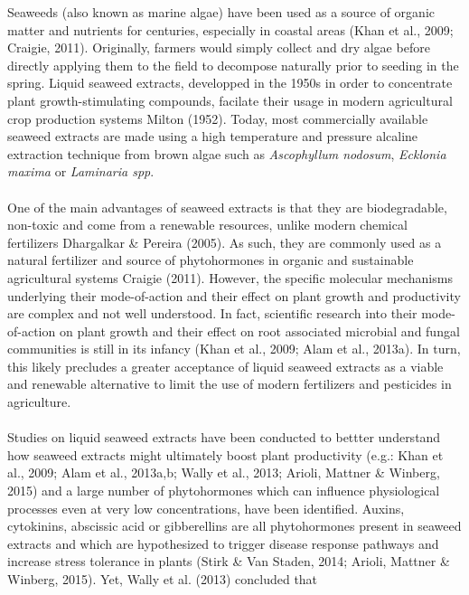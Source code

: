\documentclass[11pt,]{article}
\begin{document}
Seaweeds (also known as marine algae) have been used as a source of
organic matter and nutrients for centuries, especially in coastal areas
(Khan et al., 2009; Craigie, 2011). Originally, farmers would simply
collect and dry algae before directly applying them to the field to
decompose naturally prior to seeding in the spring. Liquid seaweed
extracts, developped in the 1950s in order to concentrate plant
growth-stimulating compounds, facilate their usage in modern
agricultural crop production systems Milton (1952). Today, most
commercially available seaweed extracts are made using a high
temperature and pressure alcaline extraction technique from brown algae
such as \emph{Ascophyllum nodosum}, \emph{Ecklonia maxima} or
\emph{Laminaria spp}.\\
\hspace*{0.333em}\\
One of the main advantages of seaweed extracts is that they are
biodegradable, non-toxic and come from a renewable resources, unlike
modern chemical fertilizers Dhargalkar \& Pereira (2005). As such, they
are commonly used as a natural fertilizer and source of phytohormones in
organic and sustainable agricultural systems Craigie (2011). However,
the specific molecular mechanisms underlying their mode-of-action and
their effect on plant growth and productivity are complex and not well
understood. In fact, scientific research into their mode-of-action on
plant growth and their effect on root associated microbial and fungal
communities is still in its infancy (Khan et al., 2009; Alam et al.,
2013a). In turn, this likely precludes a greater acceptance of liquid
seaweed extracts as a viable and renewable alternative to limit the use
of modern fertilizers and pesticides in agriculture.\\
\hspace*{0.333em}\\
Studies on liquid seaweed extracts have been conducted to bettter
understand how seaweed extracts might ultimately boost plant
productivity (e.g.: Khan et al., 2009; Alam et al., 2013a,b; Wally et
al., 2013; Arioli, Mattner \& Winberg, 2015) and a large number of
phytohormones which can influence physiological processes even at very
low concentrations, have been identified. Auxins, cytokinins, abscissic
acid or gibberellins are all phytohormones present in seaweed extracts
and which are hypothesized to trigger disease response pathways and
increase stress tolerance in plants (Stirk \& Van Staden, 2014; Arioli,
Mattner \& Winberg, 2015). Yet, Wally et al. (2013) concluded that
\end{document}
